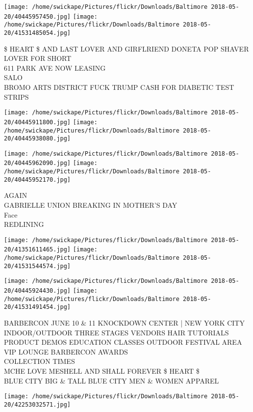 \documentclass[10pt,letterpaper]{article}
\begin{document}
\texttt{[image: /home/swickape/Pictures/flickr/Downloads/Baltimore 2018-05-20/40445957450.jpg]}
\texttt{[image: /home/swickape/Pictures/flickr/Downloads/Baltimore 2018-05-20/41531485054.jpg]}

\$ HEART \$ AND LAST LOVER AND GIRFLRIEND DONETA POP SHAVER LOVER FOR SHORT\\
611 PARK AVE NOW LEASING\\
SALO\\
BROMO ARTS DISTRICT FUCK TRUMP CASH FOR DIABETIC TEST STRIPS\\
\pagebreak

\texttt{[image: /home/swickape/Pictures/flickr/Downloads/Baltimore 2018-05-20/40445911800.jpg]}
\texttt{[image: /home/swickape/Pictures/flickr/Downloads/Baltimore 2018-05-20/40445938080.jpg]}

\texttt{[image: /home/swickape/Pictures/flickr/Downloads/Baltimore 2018-05-20/40445962090.jpg]}
\texttt{[image: /home/swickape/Pictures/flickr/Downloads/Baltimore 2018-05-20/40445952170.jpg]}

AGAIN\\
GABRIELLE UNION BREAKING IN MOTHER'S DAY\\
Face\\
REDLINING\\
\pagebreak

\texttt{[image: /home/swickape/Pictures/flickr/Downloads/Baltimore 2018-05-20/41351611465.jpg]}
\texttt{[image: /home/swickape/Pictures/flickr/Downloads/Baltimore 2018-05-20/41531544574.jpg]}

\texttt{[image: /home/swickape/Pictures/flickr/Downloads/Baltimore 2018-05-20/40445924430.jpg]}
\texttt{[image: /home/swickape/Pictures/flickr/Downloads/Baltimore 2018-05-20/41531491454.jpg]}

BARBERCON JUNE 10 \& 11 KNOCKDOWN CENTER | NEW YORK CITY INDOOR/OUTDOOR THREE STAGES VENDORS HAIR TUTORIALS PRODUCT DEMOS EDUCATION CLASSES OUTDOOR FESTIVAL AREA VIP LOUNGE BARBERCON AWARDS\\
COLLECTION TIMES\\
MCHE LOVE MESHELL AND SHALL FOREVER \$ HEART \$\\
BLUE CITY BIG \& TALL BLUE CITY MEN \& WOMEN APPAREL\\
\pagebreak

\texttt{[image: /home/swickape/Pictures/flickr/Downloads/Baltimore 2018-05-20/42253032571.jpg]}
\end{document}

